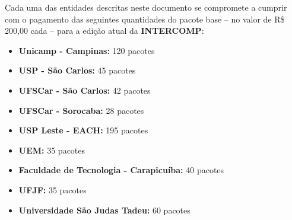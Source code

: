 \begin{article}
	\label{art:cotas}
	Cada uma das entidades descritas neste documento se compromete a cumprir com o pagamento das seguintes quantidades do pacote base -- no valor de R\$ 200,00 cada -- para a edição atual da \textbf{INTERCOMP}:
	\begin{itemize}[noitemsep]
			\item \textbf{Unicamp - Campinas:} 120 pacotes
			\item \textbf{USP - São Carlos:} 45 pacotes
			\item \textbf{UFSCar - São Carlos:} 42 pacotes
			\item \textbf{UFSCar - Sorocaba:} 28 pacotes
			\item \textbf{USP Leste - EACH:} 195 pacotes
			\item \textbf{UEM:} 35 pacotes
			\item \textbf{Faculdade de Tecnologia - Carapicuíba:} 40 pacotes
			\item \textbf{UFJF:} 35 pacotes
			\item \textbf{Universidade São Judas Tadeu:} 60 pacotes
	\end{itemize}
\end{article}